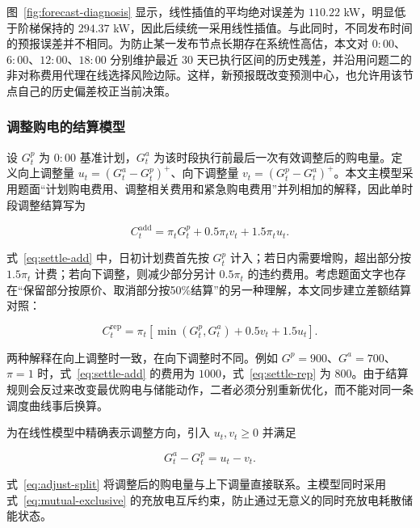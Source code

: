 图~\ref{fig:forecast-diagnosis} 显示，线性插值的平均绝对误差为 $110.22$ kW，明显低于阶梯保持的 $294.37$ kW，因此后续统一采用线性插值。与此同时，不同发布时间的预报误差并不相同。为防止某一发布节点长期存在系统性高估，本文对 $0{:}00$、$6{:}00$、$12{:}00$、$18{:}00$ 分别维护最近 $30$ 天已执行区间的历史残差，并沿用问题二的非对称费用代理在线选择风险边际。这样，新预报既改变预测中心，也允许用该节点自己的历史偏差校正当前决策。

\subsubsection{调整购电的结算模型}
\label{sec:settlement}

设 $G^p_t$ 为 $0{:}00$ 基准计划，$G^a_t$ 为该时段执行前最后一次有效调整后的购电量。定义向上调整量 $u_t=(G^a_t-G^p_t)^+$、向下调整量 $v_t=(G^p_t-G^a_t)^+$。本文主模型采用题面“计划购电费用、调整相关费用和紧急购电费用”并列相加的解释，因此单时段调整结算写为

\begin{equation}
    C_t^{\text{add}}=\pi_tG^p_t+0.5\pi_tv_t+1.5\pi_tu_t .
    \label{eq:settle-add}
\end{equation}

式~\eqref{eq:settle-add} 中，日初计划费首先按 $G^p_t$ 计入；若日内需要增购，超出部分按 $1.5\pi_t$ 计费；若向下调整，则减少部分另计 $0.5\pi_t$ 的违约费用。考虑题面文字也存在“保留部分按原价、取消部分按50\%结算”的另一种理解，本文同步建立差额结算对照：

\begin{equation}
    C_t^{\text{rep}}=\pi_t\left[\min(G^p_t,G^a_t)+0.5v_t+1.5u_t\right].
    \label{eq:settle-rep}
\end{equation}

两种解释在向上调整时一致，在向下调整时不同。例如 $G^p=900$、$G^a=700$、$\pi=1$ 时，式~\eqref{eq:settle-add} 的费用为 $1000$，式~\eqref{eq:settle-rep} 为 $800$。由于结算规则会反过来改变最优购电与储能动作，二者必须分别重新优化，而不能对同一条调度曲线事后换算。

为在线性模型中精确表示调整方向，引入 $u_t,v_t\ge0$ 并满足

\begin{equation}
    G^a_t-G^p_t=u_t-v_t .
    \label{eq:adjust-split}
\end{equation}

式~\eqref{eq:adjust-split} 将调整后的购电量与上下调量直接联系。主模型同时采用式~\eqref{eq:mutual-exclusive} 的充放电互斥约束，防止通过无意义的同时充放电耗散储能状态。

